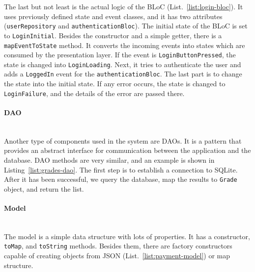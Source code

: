 

The last but not least is the actual logic of the BLoC (List.~\ref{list:login-bloc}). It uses previously defined state and event classes, and it has two attributes (\texttt{userRepository} and \texttt{authenticationBloc}). The initial state of the BLoC is set to \texttt{LoginInitial}. Besides the constructor and a simple getter, there is a \texttt{mapEventToState} method. It converts the incoming events into states which are consumed by the presentation layer. If the event is \texttt{LoginButtonPressed}, the state is changed into \texttt{LoginLoading}. Next, it tries to authenticate the user and adds a \texttt{LoggedIn} event for the \texttt{authenticationBloc}. The last part is to change the state into the initial state. If any error occurs, the state is changed to \texttt{LoginFailure}, and the details of the error are passed there.




\paragraph{\large{DAO}}\mbox{}\\[2pt]
Another type of components used in the system are DAOs. It is a pattern that provides an abstract interface for communication between the application and the database. DAO methods are very similar, and an example is shown in Listing~\ref{list:grades-dao}. The first step is to establish a connection to SQLite. After it has been successful, we query the database, map the results to \texttt{Grade} object, and return the list.




\paragraph{\large{Model}}\mbox{}\\[2pt]
The model is a simple data structure with lots of properties. It has a constructor, \texttt{toMap}, and \texttt{toString} methods. Besides them, there are factory constructors capable of creating objects from JSON (List.~\ref{list:payment-model}) or map structure.

